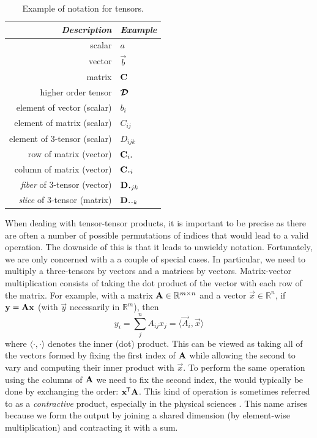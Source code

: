 \begin{table}
\centering
\begin{tabu} to 0.5\linewidth {|r|l|}
\hline 
\textit{Description} & \textit{Example} \\
\hline
scalar & \(a\) \\
vector & \(\vec{b}\) \\
matrix & \(\mathbf{C}\) \\
higher order tensor & \(\bm{\mathcal{D}}\) \\
element of vector (scalar) & \(b_i\) \\
element of matrix (scalar) & \(C_{ij}\) \\
element of 3-tensor (scalar) & \(D_{ijk}\) \\
row of matrix (vector) & \(\vec{C}_{i\midbullet}\) \\
column of matrix (vector) & \(\vec{C}_{\midbullet i}\)\\
\textit{fiber} of 3-tensor (vector) & \(\vec{D}_{\midbullet jk}\)\\
\textit{slice} of 3-tensor (matrix) & \(\mat{D}_{\midbullet\midbullet k}\)\\
\hline
\end{tabu}
\caption{Example of notation for tensors.}
\label{tab:notation}
\end{table}

When dealing with tensor-tensor products, it is important to be precise as there are often
a number of possible permutations of indices that would lead to a valid operation. The downside of
this is that it leads to unwieldy notation. Fortunately, we are only concerned with a a couple of
special cases. In particular, we need to multiply a three-tensors by vectors and a matrices by
vectors. Matrix-vector multiplication consists of taking the dot product of the vector with
each row of the matrix. For example, with a matrix \(\mathbf{A} \in \mathbb{R}^{m \times n}\) and a
vector \(\vec{x} \in \mathbb{R}^n\), if \(\mathbf{y} = \mathbf{A}\mathbf{x}\) (with \(\vec{y}\) necessarily
in \(\mathbb{R}^m\)), then
\begin{equation}\label{eq:matmul}
	y_i = \sum_j^n A_{ij} x_j
		= \langle \vec{A}_i, \vec{x}\rangle
\end{equation} where \(\langle \cdot, \cdot \rangle\) denotes the inner (dot) product. This can be viewed
as taking all of the vectors formed by fixing the first index of \(\mathbf{A}\) while allowing the second
to vary and computing their inner product with \(\vec{x}\). To perform the same operation using the
columns of \(\mathbf{A}\) we need to fix the second index, the would typically be done by exchanging the
order: \(\mathbf{x}^{\mkern-1.5mu\mathsf{T}}\mathbf{A}\). This kind of operation is sometimes referred to as a
\emph{contractive} product, especially in the physical sciences \autocite{Orus2014}. This name
arises because we form the output by joining a shared dimension (by element-wise multiplication) and
contracting it with a sum.

